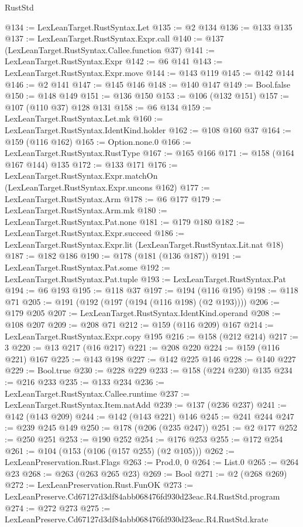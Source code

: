 \begin{lexlean}{RustStd}
\begin{coremodule}
@134 := LexLeanTarget.RustSyntax.Let
@135 := @2 @134
@136 := @133 @135
@137 := LexLeanTarget.RustSyntax.Expr.call
@140 := @137 (LexLeanTarget.RustSyntax.Callee.function @37)
@141 := LexLeanTarget.RustSyntax.Expr
@142 := @6 @141
@143 := LexLeanTarget.RustSyntax.Expr.move
@144 := @143 @119
@145 := @142 @144
@146 := @2 @141
@147 := @145 @146
@148 := @140 @147
@149 := Bool.false
@150 := @148 @149
@151 := @136 @150
@153 := @106 (@132 @151)
@157 := @107 (@110 @37) @128 @131
@158 := @6 @134
@159 := LexLeanTarget.RustSyntax.Let.mk
@160 := LexLeanTarget.RustSyntax.IdentKind.holder
@162 := @108 @160 @37
@164 := @159 (@116 @162)
@165 := Option.none.{0}
@166 := LexLeanTarget.RustSyntax.RustType
@167 := @165 @166
@171 := @158 (@164 @167 @144) @135
@172 := @133 @171
@176 := LexLeanTarget.RustSyntax.Expr.matchOn (LexLeanTarget.RustSyntax.Expr.uncons @162)
@177 := LexLeanTarget.RustSyntax.Arm
@178 := @6 @177
@179 := LexLeanTarget.RustSyntax.Arm.mk
@180 := LexLeanTarget.RustSyntax.Pat.none
@181 := @179 @180
@182 := LexLeanTarget.RustSyntax.Expr.succeed
@186 := LexLeanTarget.RustSyntax.Expr.lit (LexLeanTarget.RustSyntax.Lit.nat @18)
@187 := @182 @186
@190 := @178 (@181 (@136 @187))
@191 := LexLeanTarget.RustSyntax.Pat.some
@192 := LexLeanTarget.RustSyntax.Pat.tuple
@193 := LexLeanTarget.RustSyntax.Pat
@194 := @6 @193
@195 := @118 @37
@197 := @194 (@116 @195)
@198 := @118 @71
@205 := @191 (@192 (@197 (@194 (@116 @198) (@2 @193))))
@206 := @179 @205
@207 := LexLeanTarget.RustSyntax.IdentKind.operand
@208 := @108 @207
@209 := @208 @71
@212 := @159 (@116 @209) @167
@214 := LexLeanTarget.RustSyntax.Expr.copy @195
@216 := @158 (@212 @214)
@217 := 3
@220 := @13 @217 (@16 @217)
@221 := @208 @220
@224 := @159 (@116 @221) @167
@225 := @143 @198
@227 := @142 @225 @146
@228 := @140 @227
@229 := Bool.true
@230 := @228 @229
@233 := @158 (@224 @230) @135
@234 := @216 @233
@235 := @133 @234
@236 := LexLeanTarget.RustSyntax.Callee.runtime
@237 := LexLeanTarget.RustSyntax.Item.natAdd
@239 := @137 (@236 @237)
@241 := @142 (@143 @209)
@244 := @142 (@143 @221) @146
@245 := @241 @244
@247 := @239 @245 @149
@250 := @178 (@206 (@235 @247))
@251 := @2 @177
@252 := @250 @251
@253 := @190 @252
@254 := @176 @253
@255 := @172 @254
@261 := @104 (@153 (@106 (@157 @255) (@2 @105)))
@262 := LexLeanPreservation.Rust.Flags
@263 := Prod.{0, 0}
@264 := List.{0}
@265 := @264 @23
@268 := @263 (@263 @265 @23)
@269 := Bool
@271 := @2 (@268 @269)
@272 := LexLeanPreservation.Rust.FunOK
@273 := LexLeanPreserve.Cd67127d3df84abb068476fd930d23eac.R4.RustStd.program
@274 := @272 @273
@275 := LexLeanPreserve.Cd67127d3df84abb068476fd930d23eac.R4.RustStd.krate

\end{coremodule}
\end{lexlean}
